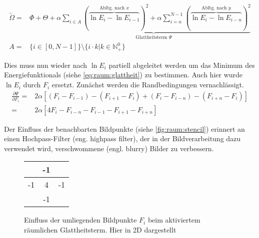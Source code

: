 \begin{align}
\label{eq:raum:glattheit}
\tilde{\Omega} =& 
    \Phi + \Theta +
    \underbrace{
        \alpha \sum_{i\in A}
            (\overbrace{
                \ln E_i - \ln E_{i-1}
            }^{\mbox{Abltg. nach }x}
        )^2
        +\alpha \sum_{i=n}^{N-1}(
            \overbrace{
                \ln E_i - \ln E_{i-n}
            }^{\mbox{Abltg. nach }y}
        )^2
    }_{\mbox{Glattheitsterm }\Psi}\\
    \label{eq:raum:x}
    A=& \{ i \in [0,N-1]\} \setminus \{ i \cdot k | k \in \mathbb{N}_+^0 \}
\end{align}

Dies muss nun wieder nach $\ln E_i$ partiell abgeleitet werden um das Minimum des Energiefunktionals (siehe \autoref{eq:raum:glattheit}) zu bestimmen. Auch hier wurde $\ln E_i$ durch $F_i$ ersetzt. Zunächst werden die Randbedingungen vernachlässigt.
\begin{align}
\label{eq:raum:derivate}
\frac{\partial \Psi}{\partial F_i} =& 2\alpha[(F_i - F_{i-1}) - (F_{i+1} - F_i) + (F_i - F_{i-n})-(F_{i+n}- F_i)]\\
=&2\alpha[4 F_i-F_{i-n} - F_{i-1} - F_{i+1} - F_{i+n}]
\end{align}


Der Einfluss der benachbarten Bildpunkte (siehe \autoref{fig:raum:stencil}) erinnert an einen Hochpass-Filter (eng. highpass filter), der in der Bildverarbeitung dazu verwendet wird, verschwommene (engl. blurry) Bilder zu verbessern.

\begin{figure}[h]
  \begin{center}
    \begin{tabular}{c|c|c}
        \cline{2-2}
        & -1 & \\
        \hline
        \multicolumn{1}{|c|}{-1}
        & 4 & \multicolumn{1}{c|}{-1}\\
        \hline
        & -1 & \\
        \cline{2-2} 
    \end{tabular}
  \end{center}
\caption{Einfluss der umliegenden Bildpunkte $F_i$ beim aktiviertem räumlichen Glattheitsterm. Hier in 2D dargestellt}
\label{fig:raum:stencil}
\end{figure}

